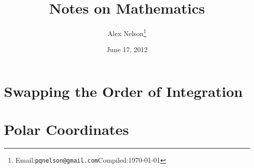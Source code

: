 \documentclass{article}
\title{Notes on Mathematics}
\date{June 17, 2012}
\author{Alex Nelson\footnote{Email:\quad\texttt{pqnelson@gmail.com}\newline Compiled:\quad\today}}
\numberwithin{equation}{section}
\begin{document}
\maketitle

\section{Swapping the Order of Integration}

\section{Polar Coordinates}

\end{document}
